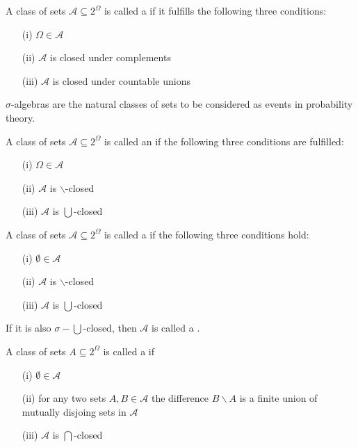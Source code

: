 \documentclass[12pt, a4paper, oneside, openright, titlepage]{book}
\begin{document}
\begin{defn}
    A class of sets $\mathcal{A} \subseteq 2^{\Omega}$ is called a  if it fulfills the following three conditions: \begin{itemize}
        \item[(i)] $\Omega \in \mathcal{A}$
        \item[(ii)] $\mathcal{A}$ is closed under complements
        \item[(iii)] $\mathcal{A}$ is closed under countable unions
    \end{itemize}
\end{defn}

$\sigma$-algebras are the natural classes of sets to be considered as events in probability theory.

\begin{defn}
    A class of sets $\mathcal{A} \subseteq 2^{\Omega}$ is called an  if the following three conditions are fulfilled: \begin{itemize}
        \item[(i)] $\Omega \in \mathcal{A}$ 
        \item[(ii)] $\mathcal{A}$ is $\backslash$-closed
        \item[(iii)] $\mathcal{A}$ is $\bigcup$-closed
    \end{itemize}
\end{defn}

\begin{defn}
    A class of sets $\mathcal{A} \subseteq 2^{\Omega}$ is called a  if the following three conditions hold:  \begin{itemize}
        \item[(i)] $\emptyset \in \mathcal{A}$ 
        \item[(ii)] $\mathcal{A}$ is $\backslash$-closed
        \item[(iii)] $\mathcal{A}$ is $\bigcup$-closed
    \end{itemize}
    If it is also $\sigma-\bigcup$-closed, then $\mathcal{A}$ is called a .
\end{defn}

\begin{defn}
    A class of sets $A\subseteq 2^{\Omega}$ is called a  if  \begin{itemize}
        \item[(i)] $\emptyset \in \mathcal{A}$ 
        \item[(ii)] for any two sets $A,B\in\mathcal{A}$ the difference $B\backslash A$ is a finite union of mutually disjoing sets in $\mathcal{A}$
        \item[(iii)] $\mathcal{A}$ is $\bigcap$-closed
    \end{itemize}
\end{defn}
\end{document}
